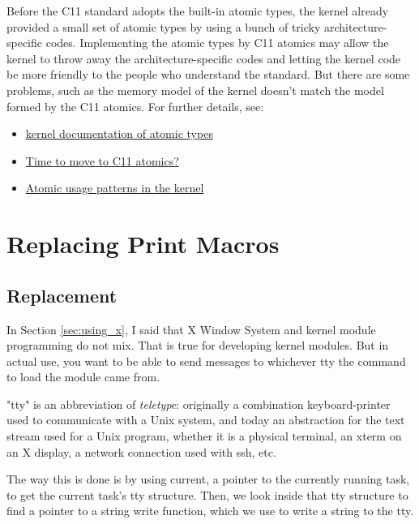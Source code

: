 \documentclass[10pt, oneside]{book}
\begin{document}

Before the C11 standard adopts the built-in atomic types, the kernel already provided a small set of atomic types by using a bunch of tricky architecture-specific codes.
Implementing the atomic types by C11 atomics may allow the kernel to throw away the architecture-specific codes and letting the kernel code be more friendly to the people who understand the standard.
But there are some problems, such as the memory model of the kernel doesn't match the model formed by the C11 atomics.
For further details, see:
\begin{itemize}
 \item \href{https://www.kernel.org/doc/Documentation/atomic_t.txt}{kernel documentation of atomic types}
 \item \href{https://lwn.net/Articles/691128/}{Time to move to C11 atomics?}
 \item \href{https://lwn.net/Articles/698315/}{Atomic usage patterns in the kernel}
\end{itemize}

\section{Replacing Print Macros}
\label{sec:print_macros}
\subsection{Replacement}
In Section \ref{sec:using_x}, I said that X Window System and kernel module programming do not mix.
That is true for developing kernel modules.
But in actual use, you want to be able to send messages to whichever tty the command to load the module came from.

"tty" is an abbreviation of \emph{teletype}: originally a combination keyboard-printer used to communicate with a Unix system, and today an abstraction for the text stream used for a Unix program, whether it is a physical terminal, an xterm on an X display, a network connection used with ssh, etc.

The way this is done is by using current, a pointer to the currently running task, to get the current task's tty structure.
Then, we look inside that tty structure to find a pointer to a string write function, which we use to write a string to the tty.

\end{document}
